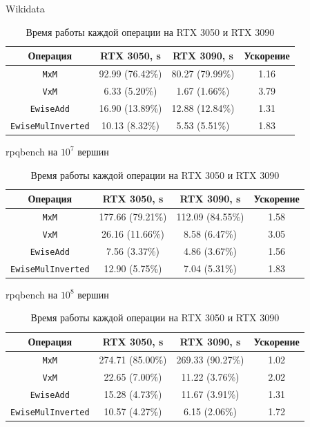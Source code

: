 \begin{table}[ht]
\centering
\caption{Время работы каждой операции на RTX 3050 и RTX 3090}
\label{tab:MxMPart}

Wikidata \\
\begin{tabular}{|c|c|c|c|}
\hline
Операция & RTX 3050, \si{\second} & RTX 3090, \si{\second} & Ускорение \\
\hline
\verb|MxM| & 92.99 (76.42\%) & 80.27 (79.99\%) & 1.16 \\
\verb|VxM| & 6.33 (5.20\%) & 1.67 (1.66\%) & 3.79 \\
\verb|EwiseAdd| & 16.90 (13.89\%) & 12.88 (12.84\%) & 1.31 \\
\verb|EwiseMulInverted| & 10.13 (8.32\%) & 5.53 (5.51\%) & 1.83 \\
\hline
\end{tabular}

rpqbench на $10^7$ вершин \\
\begin{tabular}{|c|c|c|c|}
\hline
Операция & RTX 3050, \si{\second} & RTX 3090, \si{\second} & Ускорение \\
\hline
\verb|MxM| & 177.66 (79.21\%) & 112.09 (84.55\%) & 1.58 \\
\verb|VxM| & 26.16 (11.66\%) & 8.58 (6.47\%) & 3.05 \\
\verb|EwiseAdd| & 7.56 (3.37\%) & 4.86 (3.67\%) & 1.56 \\
\verb|EwiseMulInverted| & 12.90 (5.75\%) & 7.04 (5.31\%) & 1.83 \\
\hline
\end{tabular}

rpqbench на $10^8$ вершин \\
\begin{tabular}{|c|c|c|c|}
\hline
Операция & RTX 3050, \si{\second} & RTX 3090, \si{\second} & Ускорение \\
\hline
\verb|MxM| & 274.71 (85.00\%) & 269.33 (90.27\%) & 1.02 \\
\verb|VxM| & 22.65 (7.00\%) & 11.22 (3.76\%) & 2.02 \\
\verb|EwiseAdd| & 15.28 (4.73\%) & 11.67 (3.91\%) & 1.31 \\
\verb|EwiseMulInverted| & 10.57 (4.27\%) & 6.15 (2.06\%) & 1.72 \\
\hline
\end{tabular}

\end{table}



